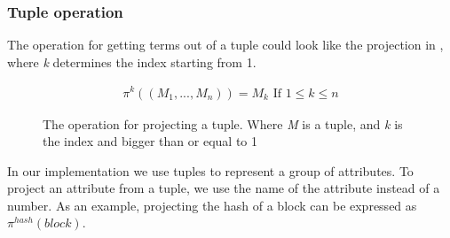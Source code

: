 \subsubsection{Tuple operation}
The operation for getting terms out of a tuple could look like the projection in , where \textit{k} determines the index starting from 1.
\begin{figure}[h]
    \begin{align*}
        \pi^k((M_1,..., M_n))=M_k \text{ If } 1\leq k \leq n
    \end{align*}
    \caption{The operation for projecting a tuple. Where \textit{M} is a tuple, and \textit{k} is the index and bigger than  or equal to 1}
\label{tupleop}
\end{figure}

In our implementation we use tuples to represent a group of attributes. To project an attribute from a tuple, we use the name of the attribute instead of a number. As an example, projecting the hash of a block can be expressed as $\pi^{hash}(block)$.
\FloatBarrier